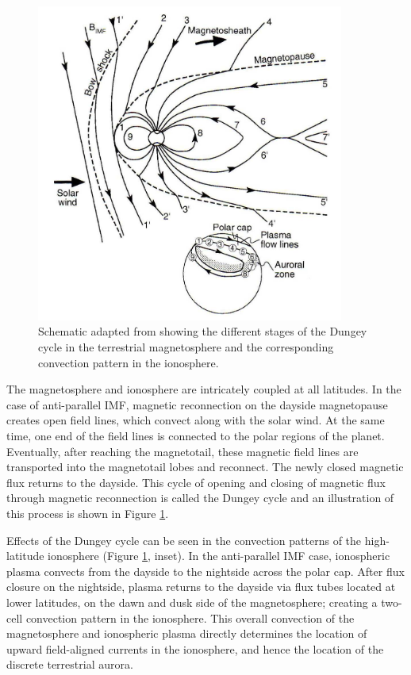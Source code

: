 \begin{figure}
    \centering
    \includegraphics[width=0.9\textwidth]{images1/dungey-cycle.png}
    \caption{Schematic adapted from \protect{} showing the different stages of the Dungey cycle in the terrestrial magnetosphere and the corresponding convection pattern in the ionosphere.}
    \label{fig:dungey-cycle}
\end{figure}

The magnetosphere and ionosphere are intricately coupled at all latitudes. In the case of anti-parallel IMF, magnetic reconnection on the dayside magnetopause creates open field lines, which convect along with the solar wind. At the same time, one end of the field lines is connected to the polar regions of the planet. Eventually, after reaching the magnetotail, these magnetic field lines are transported into the magnetotail lobes and reconnect. The newly closed magnetic flux returns to the dayside. This cycle of opening and closing of magnetic flux through magnetic reconnection is called the Dungey cycle and an illustration of this process is shown in Figure \ref{fig:dungey-cycle}.

Effects of the Dungey cycle can be seen in the convection patterns of the high-latitude ionosphere (Figure \ref{fig:dungey-cycle}, inset). In the anti-parallel IMF case, ionospheric plasma convects from the dayside to the nightside across the polar cap. After flux closure on the nightside, plasma returns to the dayside via flux tubes located at lower latitudes, on the dawn and dusk side of the magnetosphere; creating a two-cell convection pattern in the ionosphere. This overall convection of the magnetosphere and ionospheric plasma directly determines the location of upward field-aligned currents in the ionosphere, and hence the location of the discrete terrestrial aurora. 

